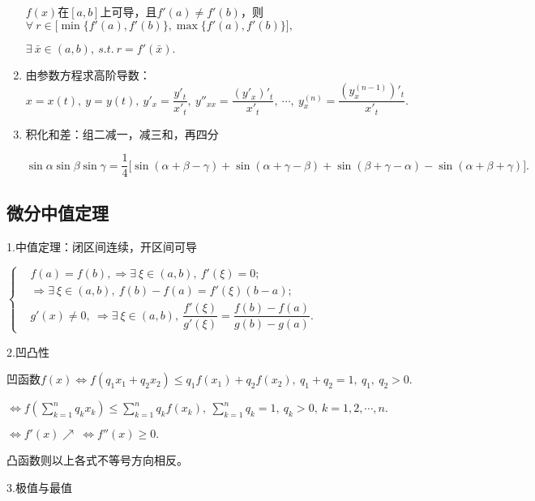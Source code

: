 \documentclass[UTF8]{ctexart}
\newcommand\no{\noindent}
\newcommand\dis{\displaystyle}
\newcommand\ls{\leqslant}
\newcommand\gs{\geqslant}
\newcommand\sumkfn{\dis\sum\limits_{k=1}^n}
\begin{document}
\begin{spacing}{2}
\begin{enumerate}[itemindent=1.4em, label=(\arabic*)]
$f(x)$在$[a,b]$上可导，且$f'(a)\neq f'(b)$，则$\forall\ r\in 
\big[\min\{f'(a),f'(b)\},\max\{f'(a),f'(b)\}\big],$

$\exists\ \bar{x}\in(a,b),\ s.t.\ r=f'(\bar{x}).$

\item 由参数方程求高阶导数：$x=x(t),\ y=y(t),\ y'_x=\dfrac{y'_t}{x'_t},\ 
y''_{xx}=\dfrac{(y'_x)'_t}{x'_t},\ \cdots,\ y_x^{(n)}=\dfrac{\left(y_{x}^{(n-1)}\right)'_t}{x'_t}.$

\item 积化和差：组二减一，减三和，再四分

$\sin\alpha\sin\beta\sin\gamma=\dfrac{1}{4}\big[\sin(\alpha+\beta-\gamma)
+\sin(\alpha+\gamma-\beta)+\sin(\beta+\gamma-\alpha)
-\sin(\alpha+\beta+\gamma)\big].$

\end{enumerate}

\subsection{微分中值定理}

\no1.中值定理：闭区间连续，开区间可导

\vspace{0.4cm}

$\left\{\begin{aligned}
&f(a)=f(b),\Rightarrow\exists\ \xi\in(a,b),\ f'(\xi)=0;\\
&\Rightarrow\exists\ \xi\in(a,b),\ f(b)-f(a)=f'(\xi)(b-a);\\
&g'(x)\neq0,\ \Rightarrow\exists\ \xi\in(a,b),\ \dfrac{f'(\xi)}{g'(\xi)}=\dfrac{f(b)-f(a)}{g(b)-g(a)}.
\end{aligned}\right.$

\vspace{0.4cm}

\no2.凹凸性

凹函数$f(x)\Leftrightarrow f(q_1x_1+q_2x_2)\ls q_1f(x_1)+q_2f(x_2),\ q_1+q_2=1,
\ q_1,\ q_2>0.$

\vspace{0.3cm}

$\Leftrightarrow f\left(\sumkfn q_kx_k\right)\ls\sumkfn q_kf(x_k),
\ \sumkfn q_k=1,\ q_k>0,\ k=1,2,\cdots,n.$

\vspace{0.3cm}

$\Leftrightarrow f'(x)\nearrow\ \Leftrightarrow f''(x)\gs0.$

凸函数则以上各式不等号方向相反。

\no3.极值与最值


\end{spacing}
\end{document}
